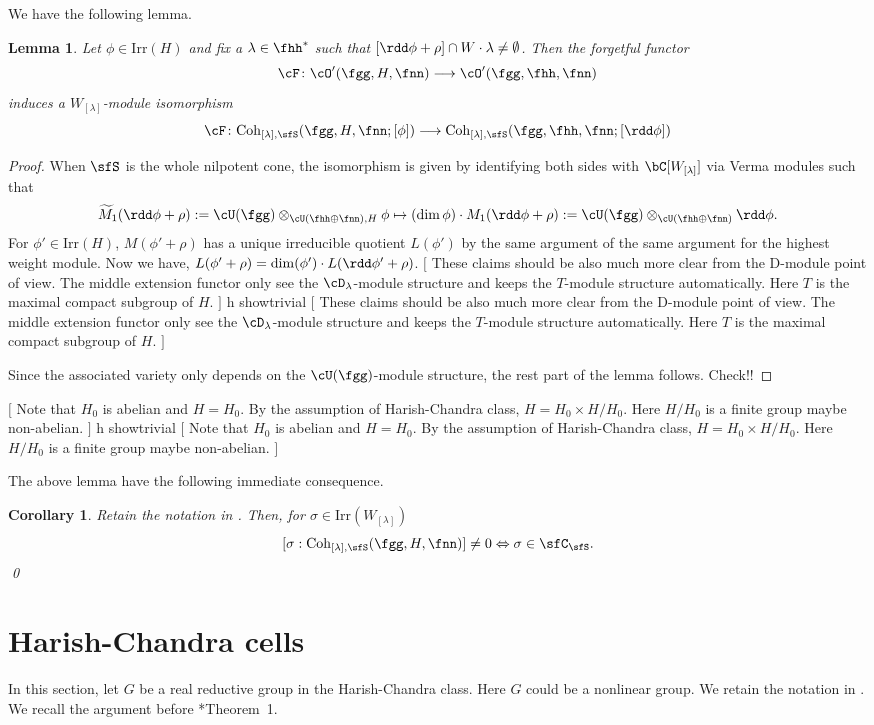 \documentclass[12pt,a4paper]{amsart}
\newcommand{\trivial}[2][]{\if\relax\detokenize{#1}\relax
  {%
      \color{orange} \vspace{0em} $[$  #2 $]$
      \color{black}
  }
  \else
\ifx#1h
\ifcsname showtrivial\endcsname
{%
    \color{orange} \vspace{0em}  $[$ #2 $]$
    \color{black}
}
\fi
\else {\red Wrong argument!} \fi
\fi
}
\newcommand{\wtM}{\widetilde{M}}
\numberwithin{equation}{section}
\newtheorem{lem}[thm]{Lemma}
\newtheorem{cor}[thm]{Corollary}
\theoremstyle{remark}
\def\Irr{\mathrm{Irr}}
\def\Coh{\mathrm{Coh}}
\begin{document}
We have the following lemma.
\begin{lem}
  Let $\phi\in \Irr(H)$ and fix a $\lambda\in \fhh^{*}$ such that
  $[\rdd \phi + \rho ]\cap W\cdot \lambda\neq \emptyset$.
  Then the forgetful functor
  \[
    \cF\colon \cO'(\fgg,H,\fnn)\longrightarrow \cO'(\fgg,\fhh,\fnn)
  \]
  induces a $W_{[\lambda]}$-module isomorphism
  \[
    \cF\colon \Coh_{[\lambda],\sfS}(\fgg,H,\fnn;[\phi])\longrightarrow
    \Coh_{[\lambda],\sfS}(\fgg,\fhh,\fnn;[\rdd\phi])
  \]
\end{lem}
\begin{proof}
  When $\sfS$ is the whole nilpotent cone, the isomorphism is
  given by identifying both sides with $\bC[W_{[\lambda]}]$ via Verma modules
  such that
  \[
  \wtM_{1}(\rdd \phi+\rho):=\cU(\fgg)\otimes_{\cU(\fhh\oplus\fnn),H}\phi
  \mapsto (\dim\phi)\cdot M_{1}(\rdd\phi+\rho):= \cU(\fgg)\otimes_{\cU(\fhh\oplus\fnn)}\rdd\phi.
  \]
  For $\phi'\in \Irr(H)$, $M(\phi'+\rho)$ has a unique irreducible quotient
  $L(\phi')$ by the same argument of the same argument for the highest weight module.   Now we have, $L(\phi'+\rho) = \dim(\phi')\cdot L(\rdd\phi'+\rho)$.
  \trivial{
    These claims should be also much more clear from the D-module point of view.
    The middle extension functor only see the $\cD_{\lambda}$-module structure
    and keeps the $T$-module structure automatically. Here $T$ is the maximal
    compact subgroup of $H$.
  }
  Since the associated variety only depends on the $\cU(\fgg)$-module structure,
  the rest part of the lemma follows.   {\color{red} Check!!}
\end{proof}

\trivial{
  Note that $H_{0}$ is abelian and $H = H_{0}$.
  By the assumption of Harish-Chandra class,
  $H = H_{0}\times H/H_{0}$. Here $H/H_{0}$ is a finite group maybe non-abelian.
}

The above lemma have the following immediate consequence.
\begin{cor}
  Retain the notation in . Then, for $\sigma\in \Irr(W_{[\lambda]})$
  \[
[\sigma:\Coh_{[\lambda],\sfS}(\fgg,H,\fnn)] \neq 0 \Leftrightarrow
  \sigma\in \sfC_{\sfS}.
  \]   \qed
\end{cor}



\section{Harish-Chandra cells}
In this section, let $G$ be a real reductive group in the Harish-Chandra class.
Here $G$ could be a nonlinear group.
We retain the notation in .
We recall the argument before \cite{Mc}*{Theorem~1}.
\end{document}

